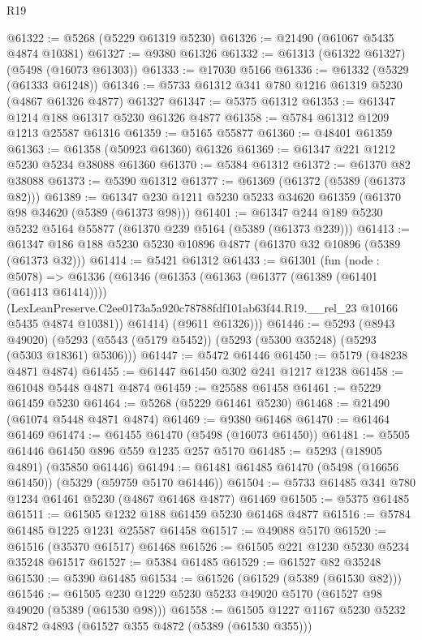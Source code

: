 \begin{lexlean}{R19}
\begin{coremodule}
@61322 := @5268 (@5229 @61319 @5230)
@61326 := @21490 (@61067 @5435 @4874 @10381)
@61327 := @9380 @61326
@61332 := @61313 (@61322 @61327) (@5498 (@16073 @61303))
@61333 := @17030 @5166
@61336 := @61332 (@5329 (@61333 @61248))
@61346 := @5733 @61312 @341 @780 @1216 @61319 @5230 (@4867 @61326 @4877) @61327
@61347 := @5375 @61312
@61353 := @61347 @1214 @188 @61317 @5230 @61326 @4877
@61358 := @5784 @61312 @1209 @1213 @25587 @61316
@61359 := @5165 @55877
@61360 := @48401 @61359
@61363 := @61358 (@50923 @61360) @61326
@61369 := @61347 @221 @1212 @5230 @5234 @38088 @61360
@61370 := @5384 @61312
@61372 := @61370 @82 @38088
@61373 := @5390 @61312
@61377 := @61369 (@61372 (@5389 (@61373 @82)))
@61389 := @61347 @230 @1211 @5230 @5233 @34620 @61359 (@61370 @98 @34620 (@5389 (@61373 @98)))
@61401 := @61347 @244 @189 @5230 @5232 @5164 @55877 (@61370 @239 @5164 (@5389 (@61373 @239)))
@61413 := @61347 @186 @188 @5230 @5230 @10896 @4877 (@61370 @32 @10896 (@5389 (@61373 @32)))
@61414 := @5421 @61312
@61433 := @61301
    (fun (node : @5078) =>
    @61336
      (@61346
        (@61353
          (@61363
            (@61377 (@61389 (@61401 (@61413 @61414))))
            (LexLeanPreserve.C2ee0173a5a920c78788fdf101ab63f44.R19.__rel_23
              @10166
              @5435
              @4874
              @10381))
          @61414)
        (@9611 @61326)))
@61446 := @5293
    (@8943 @49020)
    (@5293 (@5543 (@5179 @5452)) (@5293 (@5300 @35248) (@5293 (@5303 @18361) @5306)))
@61447 := @5472 @61446
@61450 := @5179 (@48238 @4871 @4874)
@61455 := @61447 @61450 @302 @241 @1217 @1238
@61458 := @61048 @5448 @4871 @4874
@61459 := @25588 @61458
@61461 := @5229 @61459 @5230
@61464 := @5268 (@5229 @61461 @5230)
@61468 := @21490 (@61074 @5448 @4871 @4874)
@61469 := @9380 @61468
@61470 := @61464 @61469
@61474 := @61455 @61470 (@5498 (@16073 @61450))
@61481 := @5505 @61446 @61450 @896 @559 @1235 @257 @5170
@61485 := @5293 (@18905 @4891) (@35850 @61446)
@61494 := @61481 @61485 @61470 (@5498 (@16656 @61450)) (@5329 (@59759 @5170 @61446))
@61504 := @5733 @61485 @341 @780 @1234 @61461 @5230 (@4867 @61468 @4877) @61469
@61505 := @5375 @61485
@61511 := @61505 @1232 @188 @61459 @5230 @61468 @4877
@61516 := @5784 @61485 @1225 @1231 @25587 @61458
@61517 := @49088 @5170
@61520 := @61516 (@35370 @61517) @61468
@61526 := @61505 @221 @1230 @5230 @5234 @35248 @61517
@61527 := @5384 @61485
@61529 := @61527 @82 @35248
@61530 := @5390 @61485
@61534 := @61526 (@61529 (@5389 (@61530 @82)))
@61546 := @61505 @230 @1229 @5230 @5233 @49020 @5170 (@61527 @98 @49020 (@5389 (@61530 @98)))
@61558 := @61505 @1227 @1167 @5230 @5232 @4872 @4893 (@61527 @355 @4872 (@5389 (@61530 @355)))

\end{coremodule}
\end{lexlean}
